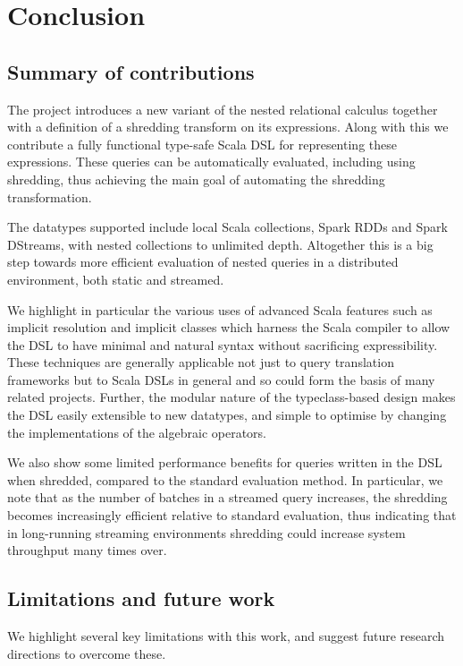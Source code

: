 \chapter{Conclusion} \label{conclusion}

\section{Summary of contributions}

The project introduces a new variant of the nested relational calculus together with a definition of a shredding transform on its expressions. Along with this we contribute a fully functional type-safe Scala DSL for representing these expressions. These queries can be automatically evaluated, including using shredding, thus achieving the main goal of automating the shredding transformation.

The datatypes supported include local Scala collections, Spark RDDs and Spark DStreams, with nested collections to unlimited depth. Altogether this is a big step towards more efficient evaluation of nested queries in a distributed environment, both static and streamed.

We highlight in particular the various uses of advanced Scala features such as implicit resolution and implicit classes which harness the Scala compiler to allow the DSL to have minimal and natural syntax without sacrificing expressibility. These techniques are generally applicable not just to query translation frameworks but to Scala DSLs in general and so could form the basis of many related projects. Further, the modular nature of the typeclass-based design makes the DSL easily extensible to new datatypes, and simple to optimise by changing the implementations of the algebraic operators.

We also show some limited performance benefits for queries written in the DSL when shredded, compared to the standard evaluation method. In particular, we note that as the number of batches in a streamed query increases, the shredding becomes increasingly efficient relative to standard evaluation, thus indicating that in long-running streaming environments shredding could increase system throughput many times over.

\section{Limitations and future work}

We highlight several key limitations with this work, and suggest future research directions to overcome these.

